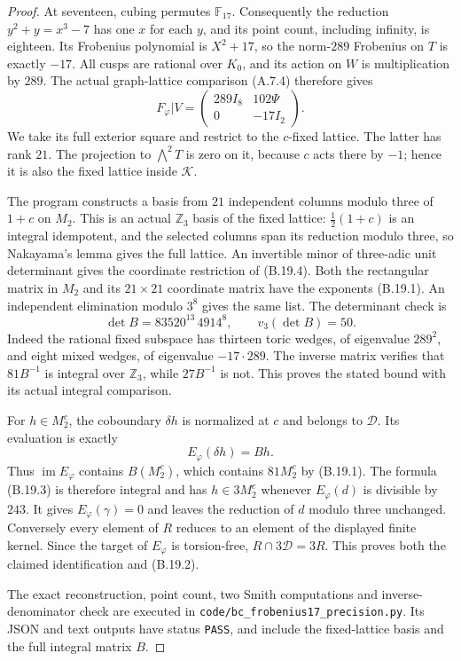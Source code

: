 \begin{proof}
At seventeen, cubing permutes $\mathbb F_{17}$.
Consequently the reduction $y^2+y=x^3-7$ has one
$x$ for each $y$, and its point count, including
infinity, is eighteen. Its Frobenius polynomial
is $X^2+17$, so the norm-$289$ Frobenius on $T$
is exactly $-17$. All cusps are rational over
$K_0$, and its action on $W$ is multiplication
by $289$. The actual graph-lattice comparison
(A.7.4) therefore gives
\[
 F_\varphi|V=
 \begin{pmatrix}
 289I_8&102\Psi\\0&-17I_2
 \end{pmatrix}.
                                                               \tag{B.19.4}
\]
We take its full exterior square and restrict
to the $c$-fixed lattice. The latter has rank
$21$. The projection to $\bigwedge^2T$ is zero
on it, because $c$ acts there by $-1$; hence
it is also the fixed lattice inside $\mathcal K$.

The program constructs a basis from $21$ independent
columns modulo three of $1+c$ on $M_2$. This is
an actual $\mathbb Z_3$ basis of the fixed lattice:
$\frac12(1+c)$ is an integral idempotent, and
the selected columns span its reduction modulo
three, so Nakayama's lemma gives the full lattice.
An invertible minor of three-adic unit determinant
gives the coordinate restriction of (B.19.4).
Both the rectangular matrix in $M_2$ and its
$21\times21$ coordinate matrix have the exponents
(B.19.1). An independent elimination modulo
$3^8$ gives the same list. The determinant check is
\[
 \det B=83520^{13}\,4914^8,
 \qquad v_3(\det B)=50.
\]
Indeed the rational fixed subspace has thirteen
toric wedges, of eigenvalue $289^2$, and eight
mixed wedges, of eigenvalue $-17\cdot289$.
The inverse matrix verifies that $81B^{-1}$
is integral over $\mathbb Z_3$, while
$27B^{-1}$ is not. This proves the stated bound
with its actual integral comparison.

For $h\in M_2^c$, the coboundary $\delta h$
is normalized at $c$ and belongs to $\mathcal D$.
Its evaluation is exactly
\[
                  E_\varphi(\delta h)=Bh.
\]
Thus $\operatorname{im}E_\varphi$ contains
$B(M_2^c)$, which contains $81M_2^c$ by
(B.19.1). The formula (B.19.3) is therefore
integral and has $h\in3M_2^c$ whenever
$E_\varphi(d)$ is divisible by $243$.
It gives $E_\varphi(\gamma)=0$ and leaves
the reduction of $d$ modulo three unchanged.
Conversely every element of $R$ reduces to
an element of the displayed finite kernel.
Since the target of $E_\varphi$ is torsion-free,
$R\cap3\mathcal D=3R$. This proves both the
claimed identification and (B.19.2).

The exact reconstruction, point count, two Smith
computations and inverse-denominator check are
executed in
\texttt{code/bc\_frobenius17\_precision.py}.
Its JSON and text outputs have status
\texttt{PASS}, and include the fixed-lattice
basis and the full integral matrix $B$.
\end{proof}

